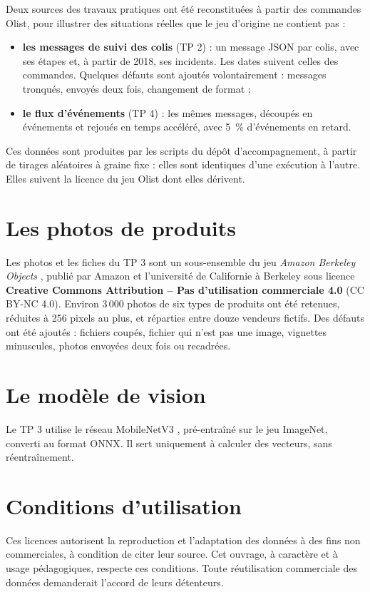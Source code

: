 Deux sources des travaux pratiques ont été reconstituées à partir des commandes Olist, pour
illustrer des situations réelles que le jeu d'origine ne contient pas :
\begin{itemize}[leftmargin=*,itemsep=2pt]
  \item \textbf{les messages de suivi des colis} (TP 2) : un message JSON par colis, avec ses étapes
        et, à partir de 2018, ses incidents. Les dates suivent celles des commandes. Quelques défauts
        sont ajoutés volontairement : messages tronqués, envoyés deux fois, changement de format ;
  \item \textbf{le flux d'événements} (TP 4) : les mêmes messages, découpés en événements et rejoués
        en temps accéléré, avec 5~\% d'événements en retard.
\end{itemize}
Ces données sont produites par les scripts du dépôt d'accompagnement, à partir de tirages
aléatoires à graine fixe : elles sont identiques d'une exécution à l'autre. Elles suivent la
licence du jeu Olist dont elles dérivent.

\section{Les photos de produits}

Les photos et les fiches du TP 3 sont un sous-ensemble du jeu \emph{Amazon Berkeley Objects}
\citep{collins2022}, publié par Amazon et l'université de Californie à Berkeley sous licence
\textbf{Creative Commons Attribution -- Pas d'utilisation commerciale 4.0} (CC BY-NC 4.0). Environ
3\,000 photos de six types de produits ont été retenues, réduites à 256 pixels au plus, et réparties
entre douze vendeurs fictifs. Des défauts ont été ajoutés : fichiers coupés, fichier qui n'est pas
une image, vignettes minuscules, photos envoyées deux fois ou recadrées.

\section{Le modèle de vision}

Le TP 3 utilise le réseau MobileNetV3 \citep{howard2019}, pré-entraîné sur le jeu ImageNet, converti
au format ONNX. Il sert uniquement à calculer des vecteurs, sans réentraînement.

\section{Conditions d'utilisation}

Ces licences autorisent la reproduction et l'adaptation des données à des fins non commerciales, à
condition de citer leur source. Cet ouvrage, à caractère et à usage pédagogiques, respecte ces
conditions. Toute réutilisation commerciale des données demanderait l'accord de leurs détenteurs.
